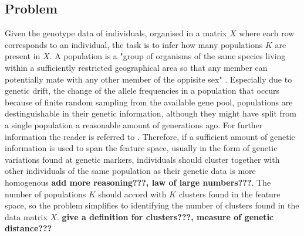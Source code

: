 \documentclass[a4paper, 11pt]{article}
\begin{document}
\subsection{Problem}
Given the genotype data of individuals, organised in a matrix $X$ where each row corresponds to an individual, the task is to infer how many populations $K$ are present in $X$. A population is a "group of organisms of the same species living within a sufficiently restricted geographical area so that any member can potentially mate with any other member of the oppisite sex" \cite{hartl1997principles}. Especially due to genetic drift, the change of the allele frequencies in a population that occurs because of finite random sampling from the available gene pool, populations are destinguishable in their genetic information, although they might have split from a single population a reasonable amount of generations ago. For further information the reader is referred to \cite{hartl1997principles}. Therefore, if a sufficient amount of genetic information is used to span the feature space, usually in the form of genetic variations found at genetic markers, individuals should cluster together with other individuals of the same population as their genetic data is more homogenous \textbf{add more reasoning???, law of large numbers???}. The number of populations $K$ should accord with $K$ clusters found in the feature space, so the problem simplifies to identifying the number of clusters found in the data matrix $X$. \textbf{give a definition for clusters???, measure of genetic distance???}
\end{document}
